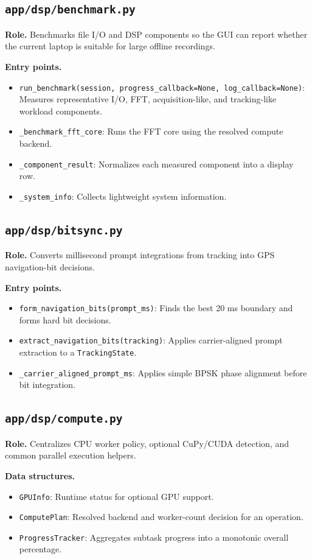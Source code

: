 \documentclass[11pt,a4paper]{article}
\newcommand{\codepath}[1]{\nolinkurl{#1}}
\newcommand{\codeheading}[1]{\texorpdfstring{\codepath{#1}}{#1}}
\newcommand{\codesym}[1]{\nolinkurl{#1}}
\newcommand{\apiitem}[2]{\item \codesym{#1}: #2}
\begin{document}
\subsection{\codeheading{app/dsp/benchmark.py}}

\textbf{Role.} Benchmarks file I/O and DSP components so the GUI can report whether the current laptop is suitable for large offline recordings.

\textbf{Entry points.}
\begin{itemize}
  \apiitem{run_benchmark(session, progress_callback=None, log_callback=None)}{Measures representative I/O, FFT, acquisition-like, and tracking-like workload components.}
  \apiitem{\_benchmark_fft_core}{Runs the FFT core using the resolved compute backend.}
  \apiitem{\_component_result}{Normalizes each measured component into a display row.}
  \apiitem{\_system_info}{Collects lightweight system information.}
\end{itemize}

\subsection{\codeheading{app/dsp/bitsync.py}}

\textbf{Role.} Converts millisecond prompt integrations from tracking into GPS navigation-bit decisions.

\textbf{Entry points.}
\begin{itemize}
  \apiitem{form_navigation_bits(prompt_ms)}{Finds the best 20 ms boundary and forms hard bit decisions.}
  \apiitem{extract_navigation_bits(tracking)}{Applies carrier-aligned prompt extraction to a \texttt{TrackingState}.}
  \apiitem{\_carrier_aligned_prompt_ms}{Applies simple BPSK phase alignment before bit integration.}
\end{itemize}

\subsection{\codeheading{app/dsp/compute.py}}

\textbf{Role.} Centralizes CPU worker policy, optional CuPy/CUDA detection, and common parallel execution helpers.

\textbf{Data structures.}
\begin{itemize}
  \apiitem{GPUInfo}{Runtime status for optional GPU support.}
  \apiitem{ComputePlan}{Resolved backend and worker-count decision for an operation.}
  \apiitem{ProgressTracker}{Aggregates subtask progress into a monotonic overall percentage.}
\end{itemize}
\end{document}
